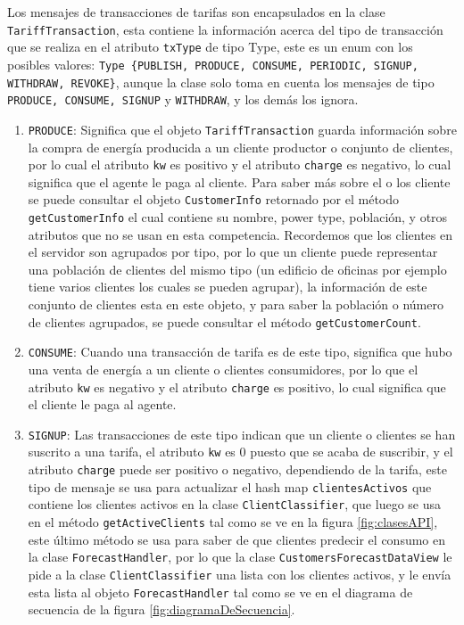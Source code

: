 Los mensajes de transacciones de tarifas son encapsulados en la clase \texttt{TariffTransaction}, esta contiene la información acerca del tipo de transacción que se realiza en el atributo \texttt{txType} de tipo Type, este es un enum con los posibles valores:  \texttt{Type \{PUBLISH, PRODUCE, CONSUME, PERIODIC, SIGNUP, WITHDRAW, REVOKE\}}, aunque la clase solo toma en cuenta los mensajes de tipo \texttt{PRODUCE, CONSUME, SIGNUP} y \texttt{WITHDRAW}, y los demás los ignora.
\renewcommand{\labelenumi}{$\bullet$ }
\begin{enumerate}
	\item \texttt{PRODUCE}: Significa que el objeto \texttt{TariffTransaction} guarda información sobre la compra de energía producida a un cliente productor o conjunto de clientes, por lo cual el atributo \texttt{kw} es positivo y el atributo \texttt{charge} es negativo, lo cual significa que el agente le paga al cliente. Para saber más sobre el o los cliente se puede consultar el objeto \texttt{CustomerInfo} retornado por el método \texttt{getCustomerInfo} el cual contiene su nombre, power type, población, y otros atributos que no se usan en esta competencia. Recordemos que los clientes en el servidor son agrupados por tipo, por lo que un cliente puede representar una población de clientes del mismo tipo (un edificio de oficinas por ejemplo tiene varios clientes los cuales se pueden agrupar), la información de este conjunto de clientes esta en este objeto, y para saber la población o número de clientes agrupados, se puede consultar el método \texttt{getCustomerCount}.
	
	 \item \texttt{CONSUME}: Cuando una transacción de tarifa es de este tipo, significa que hubo una venta de energía a un cliente o clientes consumidores,  por lo que el atributo \texttt{kw} es negativo y el atributo \texttt{charge} es positivo, lo cual significa que el cliente le paga al agente.
	
	\item \texttt{SIGNUP}: Las transacciones de este tipo indican que un cliente o clientes se han suscrito a una tarifa, el atributo \texttt{kw}	 es 0 puesto que se acaba de suscribir, y el atributo \texttt{charge} puede ser positivo o negativo, dependiendo de la tarifa, este tipo de mensaje se usa para actualizar el hash map \texttt{clientesActivos} que contiene los clientes activos en la clase \texttt{ClientClassifier}, que luego se usa en el método \texttt{getActiveClients} tal como se ve en la figura \ref{fig:clasesAPI}, este último método se usa para saber de que clientes predecir el consumo en la clase \texttt{ForecastHandler}, por lo que la clase \texttt{CustomersForecastDataView} le pide a la clase \texttt{ClientClassifier} una lista con los clientes activos, y le envía esta lista al objeto \texttt{ForecastHandler} tal como se ve en el diagrama de secuencia de la figura \ref{fig:diagramaDeSecuencia}.
	

\end{enumerate}
